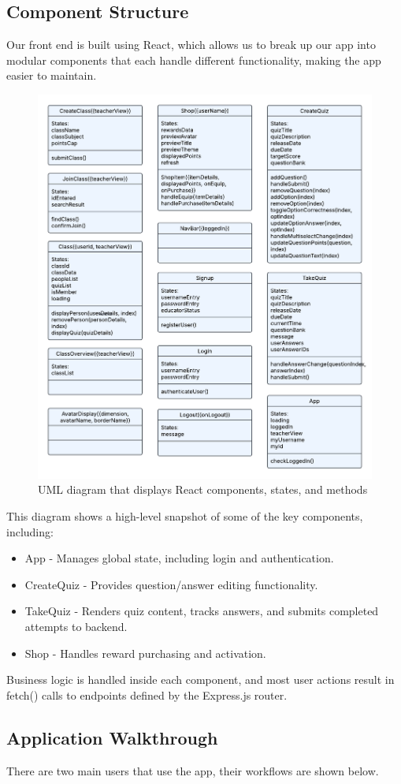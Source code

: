 \subsection{Component Structure}
Our front end is built using React, which allows us to break up our app into modular components that each handle different functionality, making the app easier to maintain.
\begin{figure}[H]
    \centering
    \includegraphics[width=0.7\linewidth]{PUT INDIVIDUAL SECTIONS HERE/images/UML_class.png}
    \caption{UML diagram that displays React components, states, and methods}
    \label{UML-diagram}
\end{figure}
This diagram shows a high-level snapshot of some of the key components, including:
\begin{itemize}
    \item App - Manages global state, including login and authentication.
    \item CreateQuiz - Provides question/answer editing functionality.
    \item TakeQuiz - Renders quiz content, tracks answers, and submits completed attempts to backend.
    \item Shop - Handles reward purchasing and activation.
\end{itemize}
Business logic is handled inside each component, and most user actions result in fetch() calls to endpoints defined by the Express.js router.

\subsection{Application Walkthrough}
There are two main users that use the app, their workflows are shown below.
